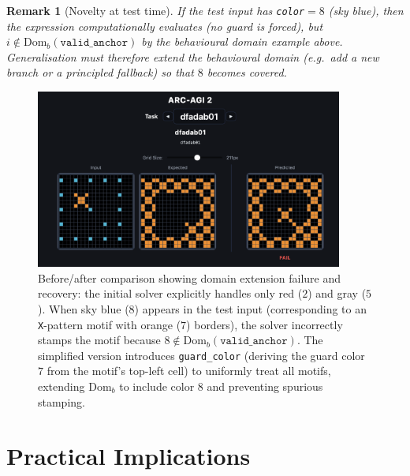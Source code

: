 \documentclass[11pt]{article}
\newtheorem{remark}{Remark}
\newcommand{\Domb}{\mathrm{Dom}_b}
\begin{document}
\begin{remark}[Novelty at test time]
If the test input has \texttt{color}$=8$ (sky blue), then the expression \emph{computationally} evaluates (no guard is forced), but $i\notin\Domb(\texttt{valid\_anchor})$ by the behavioural domain example above. Generalisation must therefore extend the behavioural domain (e.g.\ add a new branch or a principled fallback) so that $8$ becomes covered.
\end{remark}

\begin{figure}[ht]
\centering
\includegraphics[width=0.9\textwidth]{images/solver_comparison.png}
\caption{Before/after comparison showing domain extension failure and recovery: the initial solver explicitly handles only red ($2$) and gray ($5$). When sky blue ($8$) appears in the test input (corresponding to an \texttt{X}-pattern motif with orange ($7$) borders), the solver incorrectly stamps the motif because $8 \notin \Domb(\texttt{valid\_anchor})$. The simplified version introduces \texttt{guard\_color} (deriving the guard color $7$ from the motif's top-left cell) to uniformly treat all motifs, extending $\Domb$ to include color $8$ and preventing spurious stamping.}
\label{fig:comparison}
\end{figure}

\section{Practical Implications}
\end{document}
